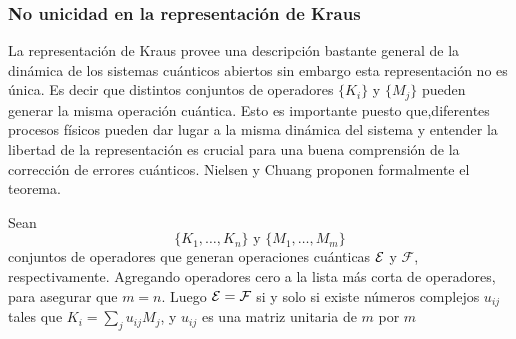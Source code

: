 \subsubsection{No unicidad en la representación de Kraus}
 La representación de Kraus provee una descripción bastante general de la dinámica de los sistemas cuánticos abiertos sin embargo esta representación no es única. Es decir que distintos conjuntos de operadores $\{K_i\}$ y $\{M_j\}$ pueden generar la misma operación cuántica. Esto es importante puesto que,diferentes procesos físicos pueden dar lugar a la misma dinámica del sistema y entender la libertad de la representación es crucial para una buena comprensión de la corrección de errores cuánticos. Nielsen y Chuang {\cite{nielsen_chuang_2010}} proponen formalmente el teorema.


 \begin{theorem}\label{Libertad_unitaria}
    
    Sean \[\{K_1,\ldots,K_n\} \text{ y } \{M_1,\ldots , M_m\}\] conjuntos de operadores que generan operaciones cuánticas $\mathcal{E}$ y $\mathcal{F}$, respectivamente. Agregando operadores cero a la lista más corta de operadores, para asegurar que $m=n$. Luego $\mathcal{E}=\mathcal{F}$ si y solo si existe números complejos $u_{ij}$ tales que $K_i=\sum_j u_{ij}M_j$, y $u_{ij}$ es una matriz unitaria de $m$ por $m$
    
 \end{theorem}

